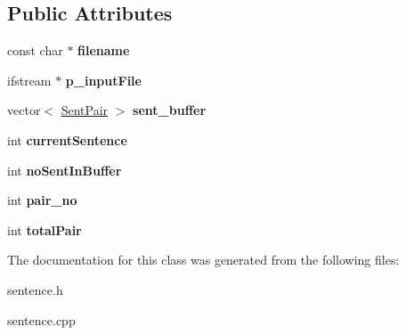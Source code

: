 \subsection*{\-Public \-Attributes}
\begin{DoxyCompactItemize}
\item 
\hypertarget{classSentenceHandle_a2688829cca12997876fd10a6667218d2}{const char $\ast$ {\bfseries filename}}\label{classSentenceHandle_a2688829cca12997876fd10a6667218d2}

\item 
\hypertarget{classSentenceHandle_aa380c6fe076f8404a3bcca7141d49508}{ifstream $\ast$ {\bfseries p\-\_\-input\-File}}\label{classSentenceHandle_aa380c6fe076f8404a3bcca7141d49508}

\item 
\hypertarget{classSentenceHandle_a9a92653d92f930afdf91d8a2c8705996}{vector$<$ \hyperlink{classSentPair}{\-Sent\-Pair} $>$ {\bfseries sent\-\_\-buffer}}\label{classSentenceHandle_a9a92653d92f930afdf91d8a2c8705996}

\item 
\hypertarget{classSentenceHandle_aea4fe8309461a5aab906ca66964c87d0}{int {\bfseries current\-Sentence}}\label{classSentenceHandle_aea4fe8309461a5aab906ca66964c87d0}

\item 
\hypertarget{classSentenceHandle_aca1a31bc2e3cd24ffdd828d46c6e8bb2}{int {\bfseries no\-Sent\-In\-Buffer}}\label{classSentenceHandle_aca1a31bc2e3cd24ffdd828d46c6e8bb2}

\item 
\hypertarget{classSentenceHandle_adfda8d71959c103806c4fbbca0b5c095}{int {\bfseries pair\-\_\-no}}\label{classSentenceHandle_adfda8d71959c103806c4fbbca0b5c095}

\item 
\hypertarget{classSentenceHandle_a003befce39ca49677228821d23171189}{int {\bfseries total\-Pair}}\label{classSentenceHandle_a003befce39ca49677228821d23171189}

\end{DoxyCompactItemize}


\-The documentation for this class was generated from the following files\-:\begin{DoxyCompactItemize}
\item 
sentence.\-h\item 
sentence.\-cpp\end{DoxyCompactItemize}
